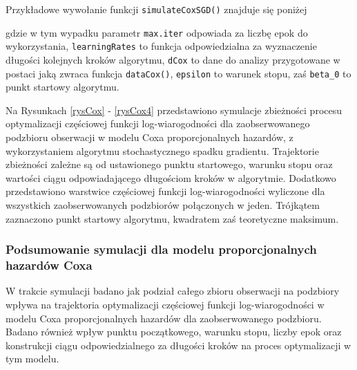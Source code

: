 Przykładowe wywołanie funkcji \texttt{simulateCoxSGD()} znajduje się poniżej

\begin{Shaded}
\begin{Highlighting}[]
 \NormalTok{/(}\NormalTok{*}
                \NormalTok{, } \NormalTok{, } \NormalTok{(}\NormalTok{,}\NormalTok{))}
\end{Highlighting}
\end{Shaded}
gdzie w tym wypadku parametr \texttt{max.iter} odpowiada za liczbę epok do wykorzystania, \texttt{learningRates} to funkcja odpowiedzialna za wyznaczenie długości kolejnych kroków algorytmu, \texttt{dCox} to dane do analizy przygotowane w postaci jaką zwraca funkcja \texttt{dataCox()}, \texttt{epsilon} to warunek stopu, zaś \texttt{beta\_0} to punkt startowy algorytmu.

Na Rysunkach \ref{rysCox} - \ref{rysCox4} przedstawiono symulacje zbieżności procesu optymalizacji częściowej funkcji log-wiarogodności dla zaobserwowanego podzbioru obserwacji w modelu Coxa proporcjonalnych hazardów, z wykorzystaniem algorytmu stochastycznego spadku gradientu. Trajektorie zbieżności zależne są od ustawionego punktu startowego, warunku stopu oraz wartości ciągu odpowiadającego długościom kroków w algorytmie. Dodatkowo przedstawiono warstwice częściowej funkcji log-wiarogodności wyliczone dla wszystkich zaobserwowanych podzbiorów połączonych w jeden. Trójkątem zaznaczono punkt startowy algorytmu, kwadratem zaś teoretyczne maksimum. 

\newpage
\subsubsection{Podsumowanie symulacji dla modelu proporcjonalnych hazardów Coxa}

W trakcie symulacji badano jak podział całego zbioru obserwacji na podzbiory wpływa na trajektoria optymalizacji częściowej funkcji log-wiarogodności w modelu Coxa proporcjonalnych hazardów dla zaobserwowanego podzbioru. Badano również wpływ punktu początkowego, warunku stopu, liczby epok oraz konstrukcji ciągu odpowiedzialnego za długości kroków na proces optymalizacji w tym modelu. 

